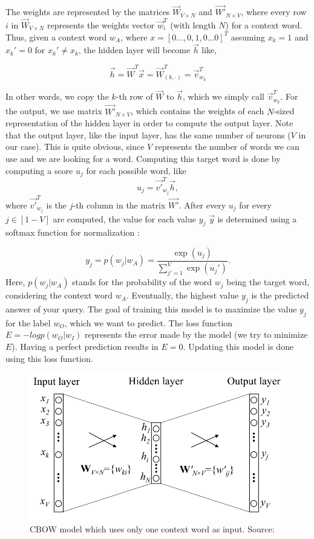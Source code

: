 \documentclass[a4paper,11pt]{article}
\begin{document}
The weights are represented by the matrices $\vec{W}_{V \times N}$ and $\vec{W'}_{N \times V}$, where every row $i$ in $\vec{W}_{V \times N}$ represents the weights vector $\vec{w}^T_i$ (with length $N$) for a context word. Thus, given a context word $w_A$, where $x = [0\ldots,0,1,0\ldots0]^T$ assuming $x_k=1$ and $x_k'=0$ for $x_k' \not= x_k$, the hidden layer will become $\vec{h}$ like,

\begin{equation}
\vec{h} = \vec{W}^T\vec{x} = \vec{W}^T_{(k,\cdot)} = \vec{v}^T_{w_k}
\end{equation}

In other words, we copy the $k$-th row of $\vec{W}$ to $\vec{h}$, which we simply call $\vec{v}^T_{w_k}$. For the output, we use matrix $\vec{W'}_{N \times V}$, which contains the weights of each $N$-sized representation of the hidden layer in order to compute the output layer. Note that the output layer, like the input layer, has the same number of neurons ($V$ in our case). This is quite obvious, since $V$ represents the number of words we can use and we are looking for a word. Computing this target word is done by computing a score $u_j$ for each possible word, like
\begin{equation}
u_j = \vec{v'}_{w_j}^T \vec{h},
\end{equation}
where $\vec{v'}_{w_j}^T$ is the $j$-th column in the matrix $\vec{W'}$. After every $u_j$ for every $j \in [1-V]$ are computed, the value for each value $y_j$ $\vec{y}$ is determined using a softmax function for normalization \cite{bishop2007pattern}:

\begin{equation}
y_j = p(w_j|w_A) = \dfrac{\exp(u_j)}{\sum_{j'=1}^V \exp(u_j')}.
\end{equation}
Here, $p(w_j|w_A)$ stands for the probability of the word $w_j$ being the target word, considering the context word $w_A$. Eventually, the highest value $y_j$ is the predicted answer of your query. The goal of training this model is to maximize the value $y_j$ for the label $w_O$, which we want to predict. The loss function $E=-log \textit{p}(w_O|w_I)$ represents the error made by the model (we try to minimize $E$). Having a perfect prediction results in $E=0$. Updating this model is done using this loss function.

\begin{figure}[H]
\centering
\includegraphics[width=.7\linewidth]{one-context-word.png}
\caption{CBOW model which uses only one context word as input. Source: \cite{Rong2014word2vec}}
\label{figure:one-context-word}
\end{figure}
\end{document}
